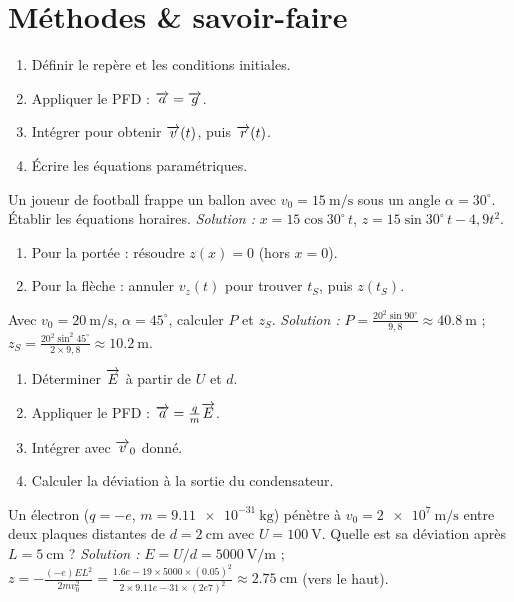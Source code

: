 \section{Méthodes \& savoir-faire}

\begin{enumerate}
\item Définir le repère et les conditions initiales.
\item Appliquer le PFD : $\overrightarrow{a} = \overrightarrow{g}$.
\item Intégrer pour obtenir $\overrightarrow{v}(t)$, puis $\overrightarrow{r}(t)$.
\item Écrire les équations paramétriques.
\end{enumerate}
\begin{exemple}
Un joueur de football frappe un ballon avec $v_0=\SI{15}{\metre\per\second}$ sous un angle $\alpha=30^\circ$. Établir les équations horaires.
\emph{Solution :} $x=15\cos30^\circ\,t$, $z=15\sin30^\circ\,t - 4,9 t^2$.
\end{exemple}

\begin{enumerate}
\item Pour la portée : résoudre $z(x)=0$ (hors $x=0$).
\item Pour la flèche : annuler $v_z(t)$ pour trouver $t_S$, puis $z(t_S)$.
\end{enumerate}
\begin{exemple}
Avec $v_0=\SI{20}{\metre\per\second}$, $\alpha=45^\circ$, calculer $P$ et $z_S$.
\emph{Solution :} $P = \frac{20^2\sin90^\circ}{9,8} \approx \SI{40,8}{\metre}$ ; $z_S = \frac{20^2\sin^2 45^\circ}{2\times9,8} \approx \SI{10,2}{\metre}$.
\end{exemple}

\begin{enumerate}
\item Déterminer $\overrightarrow{E}$ à partir de $U$ et $d$.
\item Appliquer le PFD : $\overrightarrow{a} = \frac{q}{m}\overrightarrow{E}$.
\item Intégrer avec $\overrightarrow{v}_0$ donné.
\item Calculer la déviation à la sortie du condensateur.
\end{enumerate}
\begin{exemple}
Un électron ($q=-e$, $m=\SI{9.11e-31}{\kilogram}$) pénètre à $v_0=\SI{2e7}{\metre\per\second}$ entre deux plaques distantes de $d=\SI{2}{\centi\metre}$ avec $U=\SI{100}{\volt}$. Quelle est sa déviation après $L=\SI{5}{\centi\metre}$ ?
\emph{Solution :} $E=U/d=\SI{5000}{\volt\per\metre}$ ; $z = -\frac{(-e)E L^2}{2m v_0^2} = \frac{1.6e-19\times5000\times(0.05)^2}{2\times9.11e-31\times(2e7)^2} \approx \SI{2.75}{\centi\metre}$ (vers le haut).
\end{exemple}


